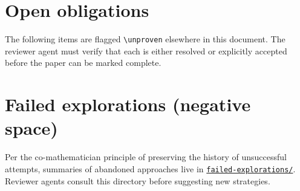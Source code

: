 \documentclass[11pt]{article}
\theoremstyle{definition}
\theoremstyle{remark}
\newcommand{\unprovenlist}{}
\newcommand{\internalref}[2]{\href{run:#1}{\texttt{#2}}}
\begin{document}

\appendix

\section{Open obligations}
\label{app:open}

The following items are flagged \texttt{\textbackslash{}unproven} elsewhere in
this document. The reviewer agent must verify that each is either resolved or
explicitly accepted before the paper can be marked complete.

\begin{description}
\unprovenlist
\end{description}

\section{Failed explorations (negative space)}

Per the co-mathematician principle of preserving the history of unsuccessful
attempts, summaries of abandoned approaches live in
\internalref{failed-explorations/}{failed-explorations/}. Reviewer agents
consult this directory before suggesting new strategies.
\end{document}
